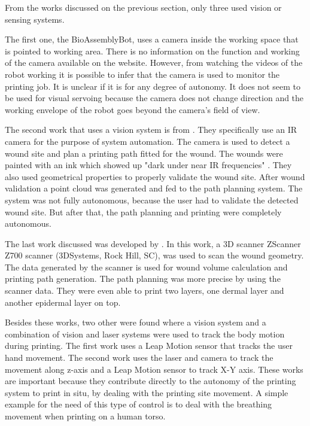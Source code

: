 From the works discussed on the previous section, only three used vision or sensing systems.

The first one, the BioAssemblyBot\textregistered, uses a camera inside the working space that is pointed to working area. There is no information on the function and working of the camera available on the website. However, from watching the videos of the robot working it is possible to infer that the camera is used to monitor the printing job. It is unclear if it is for any degree of autonomy. It does not seem to be used for visual servoing because the camera does not change direction and the working envelope of the robot goes beyond the camera's field of view.

The second work that uses a vision system is from \citeauthor{Jafari2018_robot_system_automated_wound_filling}\cite{Jafari2018_robot_system_automated_wound_filling}. They specifically use an IR camera for the purpose of system automation. The camera is used to detect a wound site and plan a printing path fitted for the wound. The wounds were painted with an ink which showed up "dark under near IR frequencies" \cite{Jafari2018_robot_system_automated_wound_filling}. They also used geometrical properties to properly validate the wound site. After wound validation a point cloud was generated and fed to the path planning system. The system was not fully autonomous, because the user had to validate the detected wound site. But after that, the path planning and printing were completely autonomous.

The last work discussed was developed by \citeauthor{Albanna2019_in_situ_bioprinting_mobile_gantry}\cite{Albanna2019_in_situ_bioprinting_mobile_gantry}. In this work, a 3D scanner ZScanner{\texttrademark} Z700 scanner (3DSystems, Rock Hill, SC), was used to scan the wound geometry. The data generated by the scanner is used for wound volume calculation and printing path generation. The path planning was more precise by using the scanner data. They were even able to print two layers, one dermal layer and another epidermal layer on top.

Besides these works, two other were found where a vision system \cite{French2018_free_moving_human_anatomy_via_temporal_coarse_fine_control} and a combination of vision and laser \cite{ONeill2017_3d_bioprinting_directly_onto_moving_human_anatomy} systems were used to track the body motion during printing. The first work uses a Leap Motion sensor that tracks the user hand movement. The second work uses the laser and camera to track the movement along z-axis and a Leap Motion sensor to track X-Y axis. These works are important because they contribute directly to the autonomy of the printing system to print in situ, by dealing with the printing site movement. A simple example for the need of this type of control is to deal with the breathing movement when printing on a human torso.\bigskip

